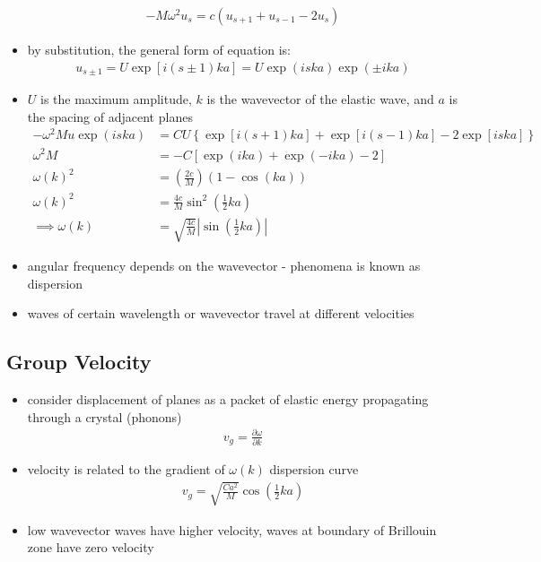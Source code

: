 \documentclass[a4paper,11pt,normalem]{article}
\begin{document}
\begin{itemize}
\begin{align*}
            -M\omega^2 u_s = c(u_{s+1}+u_{s-1}-2u_s)
        \end{align*}
    \item by substitution, the general form of equation is:
        \begin{align*}
            u_{s\pm1} = U\exp\left[i(s\pm1)ka\right] = U\exp\left(iska\right)\exp\left(\pm ika\right)
        \end{align*}
    \item \(U\) is the maximum amplitude, \(k\) is the wavevector of the elastic wave, and \(a\) is the spacing of adjacent planes
        \begin{align*}
            -\omega^2Mu\exp\left(iska\right) &= CU\left\{\exp\left[i(s+1)ka\right]+\exp\left[i(s-1)ka\right]-2\exp\left[iska\right]\right\} \\
            \omega^2M &= -C\left[\exp(ika) + \exp(-ika)-2\right] \\
            \omega(k)^2 &= \left(\frac{2c}{M}\right)(1 - \cos(ka)) \\
            \omega(k)^2 &= \frac{4c}{M}\sin^2\left(\frac{1}{2}ka\right) \\
            \implies \omega(k) &= \sqrt{\frac{4c}{M}}\left|\sin\left(\frac{1}{2}ka\right)\right|
        \end{align*}
    \item angular frequency depends on the wavevector - phenomena is known as dispersion
    \item waves of certain wavelength or wavevector travel at different velocities
\end{itemize}

\subsection{Group Velocity}

\begin{itemize}
    \item consider displacement of planes as a packet of elastic energy propagating through a crystal (phonons)
        \begin{align*}
            v_g = \frac{\partial \omega}{\partial k}
        \end{align*}
    \item velocity is related to the gradient of \(\omega(k)\) dispersion curve
        \begin{align*}
            v_g = \sqrt{\frac{Ca^2}{M}}\cos\left(\frac{1}{2}ka\right)
        \end{align*}
    \item low wavevector waves have higher velocity, waves at boundary of Brillouin zone have zero velocity
\end{itemize}
\end{document}
